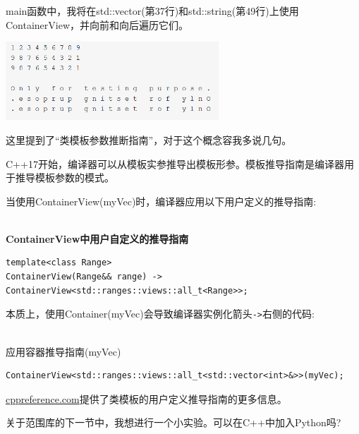 main函数中，我将在std::vector(第37行)和std::string(第49行)上使用ContainerView，并向前和向后遍历它们。

\begin{center}
\includegraphics[width=0.6\textwidth]{content/3/chapter5/images/1-3.png}\\
\end{center}

这里提到了“类模板参数推断指南”，对于这个概念容我多说几句。

\begin{tcolorbox}[breakable,enhanced jigsaw,colback=blue!5!white,colframe=blue!75!black,title={类模板参数推断指南}]
	
C++17开始，编译器可以从模板实参推导出模板形参。模板推导指南是编译器用于推导模板参数的模式。

当使用ContainerView(myVec)时，编译器应用以下用户定义的推导指南:

\hspace*{\fill} \\ %
\noindent
\textbf{ContainerView中用户自定义的推导指南}
\begin{lstlisting}[style=styleCXX]
template<class Range>
ContainerView(Range&& range) -> ContainerView<std::ranges::views::all_t<Range>>;
\end{lstlisting}

本质上，使用Container(myVec)会导致编译器实例化箭头\texttt{->}右侧的代码:

\hspace*{\fill} \\ %
\noindent
应用容器推导指南(myVec)
\begin{lstlisting}[style=styleCXX]
ContainerView<std::ranges::views::all_t<std::vector<int>&>>(myVec);
\end{lstlisting}

\href{https://en.cppreference.com/w/cpp/language/class_template_argument_deduction}{cppreference.com}提供了类模板的用户定义推导指南的更多信息。
\end{tcolorbox}

关于范围库的下一节中，我想进行一个小实验。可以在C++中加入Python吗?


